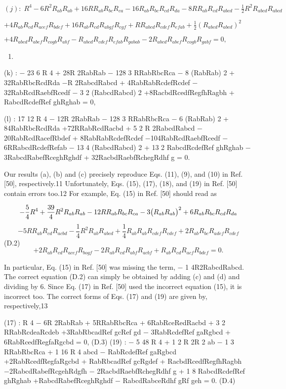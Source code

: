 \documentclass{article}
\begin{document}
${(j):\;R^4-6R^2R_{ab}R_{ab}+16RR_{ab}R_{bc}R_{ca}-16R_{ab}R_{bc}R_{cd}R_{da}-8RR_{ab}R_{cd}R_{abcd}-\frac{1}{2}R^2R_{abcd}R_{abcd}}$

${+4R_{ab}R_{cd}R_{acef}R_{bdef}+16R_{ab}R_{cd}R_{abgf}R_{cgf}+RR_{abcd}R_{cdef}R_{efab}+\frac{1}{2}\left(R_{abcd}R_{abcd}\right)^2}$

${+4R_{abcd}R_{abef}R_{cogb}R_{abf}-R_{abcd}R_{cdef}R_{efab}R_{gabab}-2R_{abcd}R_{abef}R_{cogb}R_{gabf}=0,}$
\begin{enumerate}
\item 
\end{enumerate}

(k) : − 23 6 R 4 + 28R 2RabRab − 128 3 RRabRbcRca − 8 (RabRab) 2 + 32RabRbcRcdRda −R 2RabcdRabcd + 4RabRabRcdefRcdef − 32RabRcdRaebfRcedf − 3 2 (RabcdRabcd) 2 +8RacbdRcedfRegfhRagbh + RabcdRcdefRef ghRghab = 0,

(l) : 17 12 R 4 − 12R 2RabRab − 128 3 RRabRbcRca − 6 (RabRab) 2 + 84RabRbcRcdRda +72RRabRcdRacbd + 5 2 R 2RabcdRabcd − 20RabRcdRacefRbdef + 8RabRabRcdefRcdef −104RabRcdRaebfRcedf − 6RRabcdRcdefRefab − 13 4 (RabcdRabcd) 2 + 13 2 RabcdRcdefRef ghRghab − 3RabcdRabefRceghRghdf + 32RacbdRaebfRchegRdhf g = 0.

Our results (a), (b) and (c) precisely reproduce Eqs. (11), (9), and (10) in Ref. [50], respectively.11 Unfortunately, Eqs. (15), (17), (18), and (19) in Ref. [50] contain errors too.12 For example, Eq. (15) in Ref. [50] should read as

$$-\frac{5}{4}R^{4}+\frac{39}{4}R^{2}R_{ab}R_{ab}-12RR_{ab}R_{bc}R_{ca}-3\big{(}R_{ab}R_{ab}\big{)}^{2}+6R_{ab}R_{bc}R_{cd}R_{da}$$ $$-5RR_{ab}R_{cd}R_{acbd}-\frac{1}{4}R^{2}R_{ab}R_{abcd}+\frac{1}{4}R_{ab}R_{ab}R_{cdef}R_{cdef}+2R_{ab}R_{bc}R_{adef}R_{cdef}$$ (D.2) $$+2R_{ab}R_{cd}R_{acef}R_{bogf}-2R_{ab}R_{cd}R_{abf}R_{acbf}+R_{ab}R_{cd}R_{acf}R_{bdef}=0.$$

In particular, Eq. (15) in Ref. [50] was missing the term, − 1 4R2RabcdRabcd. The correct equation (D.2) can simply be obtained by adding (c) and (d) and dividing by 6. Since Eq. (17) in Ref. [50] used the incorrect equation (15), it is incorrect too. The correct forms of Eqs. (17) and (19) are given by, respectively,13

(17) : R 4 − 6R 2RabRab + 5RRabRbcRca + 6RabRceRedRacbd + 3 2 RRabRcdeaRcdeb +3RabRbcadRef gcRef gd − 3RabRcdefRef gaRgbcd + 6RabRcedfRegfaRgcbd = 0, (D.3) (19) : − 5 48 R 4 + 1 2 R 2R 2 ab − 1 3 RRabRbcRca + 1 16 R 4 abcd − RabRcdefRef gaRgbcd +2RabRcedfRegfaRgcbd + RabRbcadRef gcRgdef + RacbdRcedfRegfhRagbh −2RabcdRabefRcgehRdgfh − 2RacbdRaebfRchegRdhf g + 1 8 RabcdRcdefRef ghRghab +RabcdRabefRceghRghdf − RabcdRabceRdhf gRf geh = 0. (D.4)
\end{document}
